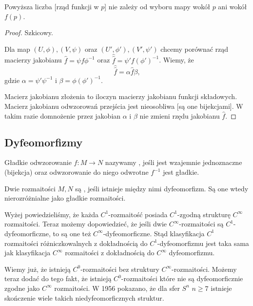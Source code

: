 \begin{fact} Powyższa liczba [rząd funkcji w $p$] nie zależy od wyboru mapy wokół $p$ ani wokół $f(p)$.
\end{fact}

\begin{proof}
  Szkicowy.

  Dla map $(U,\phi),(V,\psi)$ oraz $(U',\phi'),(V',\psi')$ chcemy porównać rząd macierzy jakobianu $\hat{f}=\psi f\phi^{-1}$ oraz $\hat{\hat{f}}=\psi'f(\phi')^{-1}$. Wiemy, że
  $$\hat{\hat{f}}=\alpha \hat{f}\beta,$$
  gdzie $\alpha=\psi'\psi^{-1}$ i $\beta=\phi(\phi')^{-1}$.

  Macierz jakobianu złożenia to iloczyn macierzy jakobianu funkcji składowych. Macierz jakobianu odwzorowań przejścia jest nieosobliwa [są one bijekcjami]. W takim razie domnożenie przez jakobian $\alpha$ i $\beta$ nie zmieni rzędu jakobianu $\hat{f}$.
\end{proof}

\subsection{Dyfeomorfizmy}

\begin{definition}[dyfeomorfizm]\label{definicja:dyfeomorfizmy} Gładkie odwzorowanie $f:M\to N$ nazywamy , jeśli jest wzajemnie jednoznaczne (bijekcja) oraz odwzorowanie do niego odwrotne $f^{-1}$ jest gładkie.

  Dwie rozmaitości $M, N$ są , jeśli istnieje między nimi dyfeomorfizm. Są one wtedy nierozróżnialne jako gładkie rozmaitości.
\end{definition}

Wyżej powiedzieliśmy, że każda $C^1$-rozmaitość posiada $C^1$-zgodną strukturę $C^\infty$ rozmaitości. Teraz możemy dopowiedzieć, że jeśli dwie $C^\infty$-rozmaitości są $C^1$-dyfeomorficzne, to są one też $C^\infty$-dyfeomorficzne. Stąd klasyfikacja $C^1$ rozmaitości różniczkowalnych z dokładnością do $C^1$-dyfeomorfizmu jest taka sama jak klasyfikacja $C^\infty$ rozmaitości z dokładnością do $C^\infty$ dyfeomorfizmu.

Wiemy już, że istnieją $C^0$-rozmaitości bez struktury $C^\infty$-rozmaitości. Możemy teraz dodać do tego fakt, że istnieją $C^0$-rozmaitości które nie są dyfeomorficznie zgodne jako $C^\infty$ rozmaitości. W 1956 pokazano, że dla sfer $S^n$ $n\geq 7$ istnieje skończenie wiele takich niedyfeomorficznych struktur. 

